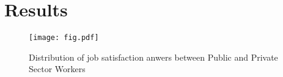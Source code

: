 \chapter{Results}

\begin{figure}[h]
\centering
\texttt{[image: fig.pdf]}
\caption{Distribution of job satisfaction anwers between Public and Private Sector Workers} \label{fig:jbsat}
\end{figure}